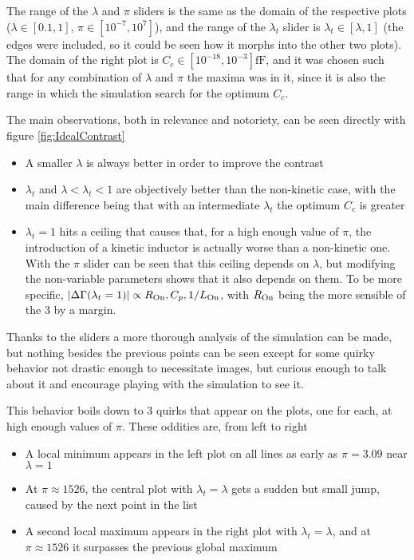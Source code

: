 \documentclass[../main.tex]{subfiles}
\begin{document}
The range of the \(\lambda\) and \(\pi\) sliders is the same as the domain
of the respective plots (\(\lambda \in [0.1, 1]\), \(\pi \in [10^{-7}, 10^{7}]\)),
and the range of the \(\lambda_{t}\) slider is \(\lambda_{t} \in [\lambda, 1]\)
(the edges were included, so it could be seen how it morphs into the other two plots).
The domain of the right plot is \(C_{c} \in [10^{-18}, 10^{-3}]\unit{\fF}\), and it
was chosen such that for any combination of \(\lambda\) and \(\pi\) the maxima
was in it, since it is also the range in which the simulation search for the
optimum \(C_{c}\).

The main observations, both in relevance and notoriety, can be seen directly
with figure \ref{fig:IdealContrast}
\begin{itemize}
    \item A smaller \(\lambda\) is always better in order to improve the contrast
    \item \(\lambda_{t}\) and \(\lambda < \lambda_{t} < 1\) are objectively better
        than the non-kinetic case, with the main difference being that with an
        intermediate \(\lambda_{t}\) the optimum \(C_{c}\) is greater
    \item \(\lambda_{t} = 1\) hits a ceiling that causes that, for a high enough
        value of \(\pi\), the introduction of a kinetic inductor is actually worse
        than a non-kinetic one. With the \(\pi\) slider can be seen that this
        ceiling depends on \(\lambda\), but modifying the non-variable parameters
        shows that it also depends on them. To be more specific,
        \(|\Delta\Gamma(\lambda_{t} = 1)|\propto R_{\text{On}}, C_{p}, 1/L_{\text{On}}\),
        with \(R_{\text{On}}\) being the more sensible of the 3 by a margin.
\end{itemize}

Thanks to the sliders a more thorough analysis of the simulation can be made,
but nothing besides the previous points can be seen except for some
quirky behavior not drastic enough to necessitate images, but curious enough
to talk about it and encourage playing with the simulation to see it.

This behavior boils down to 3 quirks that appear on the plots, one for each, at
high enough values of \(\pi\). These oddities are, from left to right

\begin{itemize}
    \item A local minimum appears in the left plot on all lines as early as
        \(\pi = 3.09\) near \(\lambda = 1\)
    \item At \(\pi \approx 1526\), the central plot with \(\lambda_{t} = \lambda\)
        gets a sudden but small jump, caused by the next point in the list
    \item A second local maximum appears in the right plot with
        \(\lambda_{t} = \lambda\), and at \(\pi \approx 1526\) it surpasses the
        previous global maximum
\end{itemize}
\end{document}
